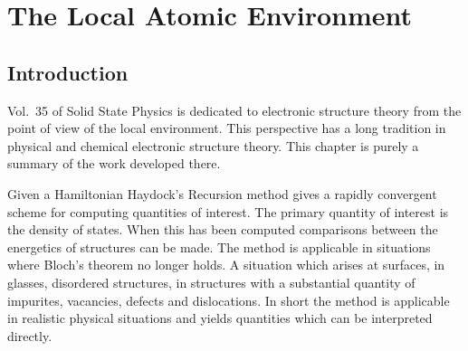 \chapter{The Local Atomic Environment}
\label{chap:invariance}
\section{Introduction}
Vol.~35 of Solid State Physics is dedicated to electronic structure
theory from the point of view of the local environment. This perspective
has a long tradition in physical and chemical electronic structure theory.
This chapter is purely a summary of the work developed there.

Given a Hamiltonian Haydock's Recursion method gives a rapidly convergent 
scheme for computing quantities of interest. The primary quantity of interest 
is the density of states. When this has been computed comparisons between the energetics of 
structures can be made. The method is applicable in situations where Bloch's theorem no longer holds.
A situation which arises at surfaces, in glasses, disordered structures, in structures with a substantial
quantity of impurites, vacancies, defects and dislocations. In short the method is applicable
in realistic physical situations and yields quantities which can be interpreted directly.


